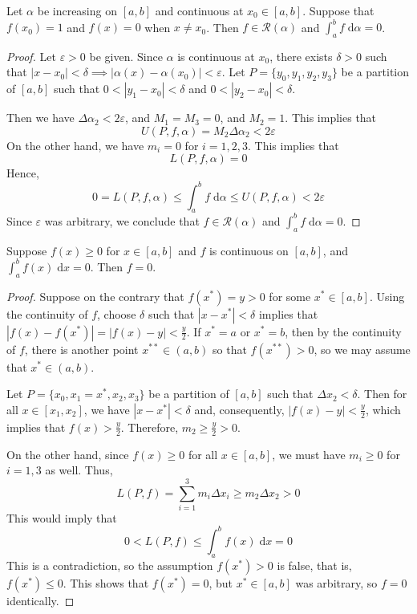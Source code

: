 \documentclass{homework}
\begin{document}
	\maketitle
	
	
	Let $\alpha$ be increasing on $[a,b]$ and continuous at $x_0 \in [a,b]$. Suppose that $f(x_0) = 1$ and $f(x) = 0$ when $x \ne x_0$. Then $f \in \mathscr{R}(\alpha)$ and $\int_a^b f\;\text{d}\alpha=0$.
	
	\begin{proof}
		Let $\varepsilon > 0$ be given. Since $\alpha$ is continuous at $x_0$, there exists $\delta > 0$ such that $|x-x_0| <\delta\implies |\alpha(x) - \alpha(x_0)| < \varepsilon$. Let $P = \{y_0, y_1, y_2, y_3\}$ be a partition of $[a,b]$ such that $0 <|y_1 - x_0| < \delta$ and $0<|y_2 -x_0| < \delta$.
		
		Then we have $\Delta \alpha_2 < 2\varepsilon$, and $M_1 = M_3 = 0$, and $M_2 = 1$. This implies that
		$$
		U(P,f,\alpha) = M_2\Delta \alpha_2 < 2\varepsilon
		$$
		On the other hand, we have $m_i = 0$ for $i=1,2,3$. This implies that
		$$
		L(P,f,\alpha) = 0
		$$
		Hence,
		$$
		0 = L(P,f,\alpha) \le \int_a^b f\;\text{d}\alpha \le U(P,f,\alpha) < 2\varepsilon
		$$
		Since $\varepsilon$ was arbitrary, we conclude that $f\in \mathscr{R}(\alpha)$ and $\int_a^b f \;\text{d}\alpha = 0$.
	\end{proof}
	
	
	Suppose $f(x) \ge 0$ for $x\in[a,b]$ and $f$ is continuous on $[a,b]$, and $\int_a^b f(x) \;\text{d}x = 0$. Then $f = 0$.
	
	\begin{proof}
		Suppose on the contrary that $f(x^*) = y > 0$ for some $x^* \in [a,b]$. Using the continuity of $f$, choose $\delta$ such that $|x - x^*| <  \delta$ implies that $|f(x) - f(x^*)| = |f(x) - y| < \frac{y}{2}$. If $x^* = a$ or $x^*=b$, then by the continuity of $f$, there is another point $x^{**}\in(a,b)$ so that $f(x^{**}) > 0$, so we may assume that $x^* \in(a,b)$.
		
		Let $P = \{x_0, x_1=x^*, x_2, x_3\}$ be a partition of $[a,b]$ such that $\Delta x_2 < \delta$. Then for all $x \in [x_1, x_2]$, we have $|x - x^*| < \delta$ and, consequently, $|f(x) - y| < \frac{y}{2}$, which implies that $f(x) > \frac{y}{2}$. Therefore, $m_2 \ge \frac{y}{2} > 0$. 
		
		On the other hand, since $f(x) \ge 0$ for all $x \in [a, b]$, we must have $m_i \ge 0$ for $i =1,3$ as well. Thus,
		$$
		L(P, f) = \sum_{i=1}^3 m_i\Delta x_i \ge m_2\Delta x_2 > 0
		$$
		This would imply that
		$$
		0 < L(P, f) \le \int_a^b f(x) \;\text{d}x = 0
		$$
		This is a contradiction, so the assumption $f(x^*) > 0$ is false, that is, $f(x^*) \le 0$. This shows that $f(x^*) =  0$, but $x^*\in[a,b]$ was arbitrary, so $f = 0$ identically.
	\end{proof}
	
\end{document}
